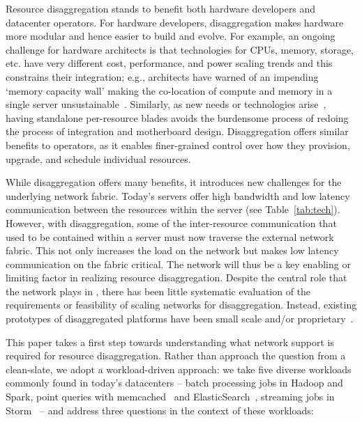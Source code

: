 Resource disaggregation stands to benefit both hardware developers and datacenter operators. %
For hardware developers, disaggregation makes hardware more modular and hence 
easier to build and evolve. 
For example, an ongoing challenge for hardware architects is that technologies for CPUs, memory, storage, etc. have very different cost, performance, and power scaling trends and this constrains their integration; e.g., architects have warned of an impending `memory capacity wall' making the co-location of compute and memory in a single server unsustainable~\cite{ddcHwDesign1}. 
Similarly, as new needs or technologies arise~\cite{memristors,nvram,reg-ex-hardware,gpus}, having standalone per-resource blades avoids the burdensome process of redoing the process of integration and motherboard design.
Disaggregation offers similar benefits to operators, as it enables finer-grained control over how they  provision, upgrade, and schedule individual resources.

While disaggregation offers many benefits, it introduces new challenges for the underlying network fabric. Today's servers offer high bandwidth and low latency communication between the resources within the server (see Table~\ref{tab:tech}). However, with disaggregation, some of the inter-resource communication that used to be contained within a server must now traverse the external network fabric. This not only increases the load on the network but makes low latency communication on the fabric critical. The network will thus be a key enabling or limiting factor in realizing resource disaggregation. 
Despite the central role that the network plays in \dis, there has been little systematic evaluation of the requirements or feasibility of scaling networks for disaggregation. Instead, existing prototypes of disaggregated platforms have been small scale and/or proprietary~\cite{rsa, hptm, fdr, seamicro}. 

This paper takes a first step towards understanding what network support is required for resource disaggregation. Rather than approach the question from a clean-slate, we adopt a workload-driven approach: we take five diverse workloads commonly found in today's datacenters -- batch processing jobs in Hadoop and Spark, point queries with memcached~\cite{memcached} and ElasticSearch~\cite{elastic}, streaming jobs in Storm~\cite{storm} -- and address three questions in the context of these workloads: 


